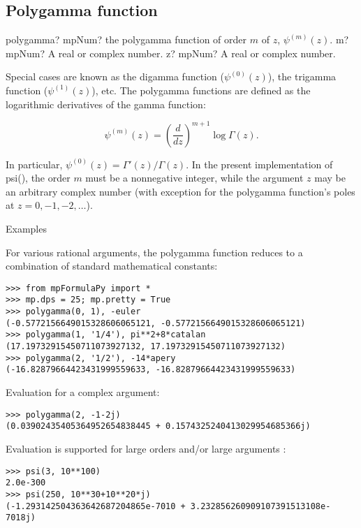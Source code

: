 \subsection{Polygamma function}


\begin{mpFunctionsExtract}
	\mpFunctionTwo
	{polygamma? mpNum? the polygamma function of order $m$ of $z$, $\psi^{(m)}(z)$.}
	{m? mpNum? A real or complex number.}
	{z? mpNum? A real or complex number.}	
\end{mpFunctionsExtract}

\vpara
Special cases are known as the digamma function ($\psi^{(0)}(z)$), the trigamma function ($\psi^{(1)}(z)$), etc. The polygamma functions are defined as the logarithmic derivatives of the gamma function:

\begin{equation}
\psi^{(m)}(z) = \left(\frac{d}{dz}\right)^{m+1} \log\Gamma(z).
\end{equation}

In particular, $\psi^{(0)}(z) = \Gamma'(z)/\Gamma(z)$. In the present implementation of psi(), the order $m$ must be a nonnegative integer, while the argument $z$ may be an arbitrary complex number (with exception for the polygamma function's poles at $z=0,-1,-2,\ldots$).

Examples

For various rational arguments, the polygamma function reduces to a combination of standard mathematical constants:

\begin{lstlisting}
>>> from mpFormulaPy import *
>>> mp.dps = 25; mp.pretty = True
>>> polygamma(0, 1), -euler
(-0.5772156649015328606065121, -0.5772156649015328606065121)
>>> polygamma(1, '1/4'), pi**2+8*catalan
(17.19732915450711073927132, 17.19732915450711073927132)
>>> polygamma(2, '1/2'), -14*apery
(-16.82879664423431999559633, -16.82879664423431999559633)
\end{lstlisting}

Evaluation for a complex argument:
\begin{lstlisting}
>>> polygamma(2, -1-2j)
(0.03902435405364952654838445 + 0.1574325240413029954685366j)
\end{lstlisting}

Evaluation is supported for large orders and/or large arguments :
\begin{lstlisting}
>>> psi(3, 10**100)
2.0e-300
>>> psi(250, 10**30+10**20*j)
(-1.293142504363642687204865e-7010 + 3.232856260909107391513108e-7018j)
\end{lstlisting}


